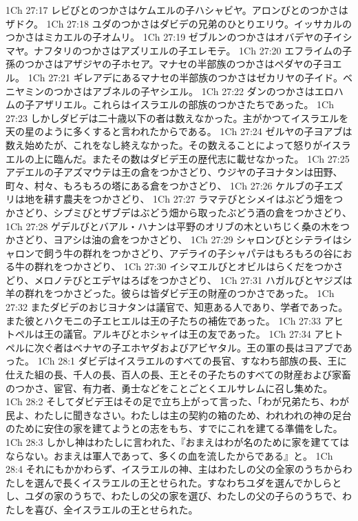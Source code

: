 1Ch 27:17  レビびとのつかさはケムエルの子ハシャビヤ。アロンびとのつかさはザドク。
1Ch 27:18  ユダのつかさはダビデの兄弟のひとりエリウ。イッサカルのつかさはミカエルの子オムリ。
1Ch 27:19  ゼブルンのつかさはオバデヤの子イシマヤ。ナフタリのつかさはアズリエルの子エレモテ。
1Ch 27:20  エフライムの子孫のつかさはアザジヤの子ホセア。マナセの半部族のつかさはペダヤの子ヨエル。
1Ch 27:21  ギレアデにあるマナセの半部族のつかさはゼカリヤの子イド。ベニヤミンのつかさはアブネルの子ヤシエル。
1Ch 27:22  ダンのつかさはエロハムの子アザリエル。これらはイスラエルの部族のつかさたちであった。
1Ch 27:23  しかしダビデは二十歳以下の者は数えなかった。主がかつてイスラエルを天の星のように多くすると言われたからである。
1Ch 27:24  ゼルヤの子ヨアブは数え始めたが、これをなし終えなかった。その数えることによって怒りがイスラエルの上に臨んだ。またその数はダビデ王の歴代志に載せなかった。
1Ch 27:25  アデエルの子アズマウテは王の倉をつかさどり、ウジヤの子ヨナタンは田野、町々、村々、もろもろの塔にある倉をつかさどり、
1Ch 27:26  ケルブの子エズリは地を耕す農夫をつかさどり、
1Ch 27:27  ラマテびとシメイはぶどう畑をつかさどり、シプミびとザブデはぶどう畑から取ったぶどう酒の倉をつかさどり、
1Ch 27:28  ゲデルびとバアル・ハナンは平野のオリブの木といちじく桑の木をつかさどり、ヨアシは油の倉をつかさどり、
1Ch 27:29  シャロンびとシテライはシャロンで飼う牛の群れをつかさどり、アデライの子シャパテはもろもろの谷におる牛の群れをつかさどり、
1Ch 27:30  イシマエルびとオビルはらくだをつかさどり、メロノテびとエデヤはろばをつかさどり、
1Ch 27:31  ハガルびとヤジズは羊の群れをつかさどった。彼らは皆ダビデ王の財産のつかさであった。
1Ch 27:32  またダビデのおじヨナタンは議官で、知恵ある人であり、学者であった。また彼とハクモニの子エヒエルは王の子たちの補佐であった。
1Ch 27:33  アヒトペルは王の議官。アルキびとホシャイは王の友であった。
1Ch 27:34  アヒトペルに次ぐ者はベナヤの子エホヤダおよびアビヤタル。王の軍の長はヨアブであった。
1Ch 28:1  ダビデはイスラエルのすべての長官、すなわち部族の長、王に仕えた組の長、千人の長、百人の長、王とその子たちのすべての財産および家畜のつかさ、宦官、有力者、勇士などをことごとくエルサレムに召し集めた。
1Ch 28:2  そしてダビデ王はその足で立ち上がって言った、「わが兄弟たち、わが民よ、わたしに聞きなさい。わたしは主の契約の箱のため、われわれの神の足台のために安住の家を建てようとの志をもち、すでにこれを建てる準備をした。
1Ch 28:3  しかし神はわたしに言われた、『おまえはわが名のために家を建ててはならない。おまえは軍人であって、多くの血を流したからである』と。
1Ch 28:4  それにもかかわらず、イスラエルの神、主はわたしの父の全家のうちからわたしを選んで長くイスラエルの王とせられた。すなわちユダを選んでかしらとし、ユダの家のうちで、わたしの父の家を選び、わたしの父の子らのうちで、わたしを喜び、全イスラエルの王とせられた。
